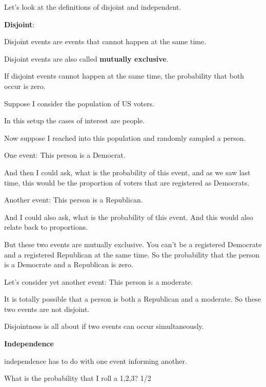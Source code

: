 \documentclass[slidestop,compress,mathserif,12pt,t,professionalfonts,xcolor=table]{beamer}
\begin{document}
\begin{frame}
{\begin{outline}
\end{outline}

Let's look at the definitions of disjoint and independent.

\textbf{Disjoint}:

\begin{outline}

\1 Disjoint events are events that cannot happen at the same time.

\1 Disjoint events are also called \textbf{mutually exclusive}.

\1 If disjoint events cannot happen at the same time, the probability that both
occur is zero.

\1 Suppose I consider the population of US voters.

\2 In this setup the cases of interest are people.

\1 Now suppose I reached into this population and randomly sampled a person.

\1 One event: This person is a Democrat.

\2 And then I could ask, what is the probability of this event, and as we saw
last time, this would be the proportion of voters that are registered as Democrats.

\1 Another event: This person is a Republican.

\2 And I could also ask, what is the probability of this event.  And this would
also relate back to proportions.

\1 But these two events are mutually exclusive.  You can't be a registered
Democrate and a registered Republican at the same time.  So the probability that
the person is a Democrate and a Republican is zero.

\1 Let's consider yet another event: This person is a moderate.

\2 It is totally possible that a person is both a Republican and a moderate.  So
these two events are not disjoint.

\2 Disjointness is all about if two events can occur simultaneously.

\end{outline}

\textbf{Independence}

\begin{outline}

\1 independence has to do with one event informing another.

\1 What is the probability that I roll a 1,2,3? 1/2


\end{outline}}
\end{frame}
\end{document}
